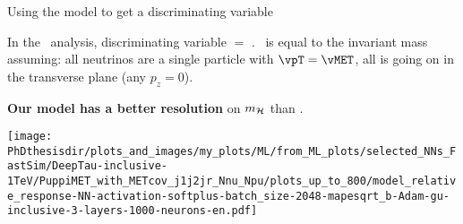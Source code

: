 \begin{frame}{Using the model to get a discriminating variable}

\begin{minipage}[c]{.54\textwidth}
\manip In the \HAtoTauTau\ analysis, discriminating variable $=$ \mTtot.
\manip \mTtot\ is equal to the invariant mass assuming:
\submanip all neutrinos are a single particle with $\vpT = \vMET$,
\submanip all is going on in the transverse plane (any $p_z = 0$).

\manip \textbf{Our model has a better resolution} on $m_{\mathcal{H}}$ than \mTtot.
\end{minipage}
\hfill
\begin{minipage}[c]{.45\textwidth}
\begin{center}
\texttt{[image: \\PhDthesisdir/plots\_and\_images/my\_plots/ML/from\_ML\_plots/selected\_NNs\_FastSim/DeepTau-inclusive-1TeV/PuppiMET\_with\_METcov\_j1j2jr\_Nnu\_Npu/plots\_up\_to\_800/model\_relative\_response-NN-activation-softplus-batch\_size-2048-mapesqrt\_b-Adam-gu-inclusive-3-layers-1000-neurons-en.pdf]}
\end{center}
\end{minipage}

\end{frame}